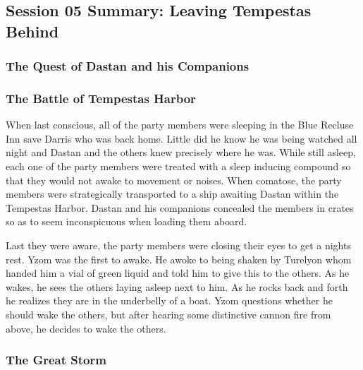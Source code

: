 \subsection{Session 05 Summary: Leaving Tempestas Behind}

\subsubsection{The Quest of Dastan and his Companions}

\subsubsection{The Battle of Tempestas Harbor}

When last conscious, all of the party members were sleeping in the Blue Recluse Inn save Darris who was back home. Little did he know he was being watched all night and Dastan and the others knew precisely where he was. While still asleep, each one of the party members were treated with a sleep inducing compound so that they would not awake to movement or noises. When comatose, the party members were strategically transported to a ship awaiting Dastan within the Tempestas Harbor. Dastan and his companions concealed the members in crates so as to seem inconspicuous when loading them aboard.

Last they were aware, the party members were closing their eyes to get a nights rest. Yzom was the first to awake. He awoke to being shaken by Turelyon whom handed him a vial of green liquid and told him to give this to the others. As he wakes, he sees the others laying asleep next to him. As he rocks back and forth he realizes they are in the underbelly of a boat. Yzom questions whether he should wake the others, but after hearing some distinctive cannon fire from above, he decides to wake the others.


\subsubsection{The Great Storm}